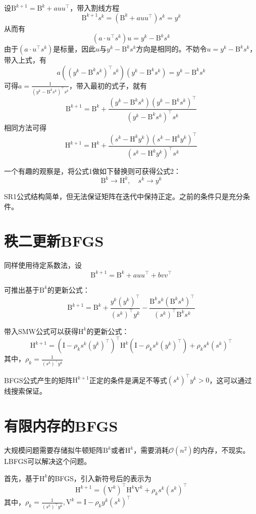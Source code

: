 \documentclass[a4paper]{D:/repositories/MyDGP/latex/PaperReadingLog}
\begin{document}
设$\mathrm{B}^{k+1}=\mathrm{B}^k+auu^\top$，带入割线方程
$$
\mathrm{B}^{k+1}s^k=(\mathrm{B}^k+auu^\top)s^k=y^k
$$
从而有
$$
(a\cdot u^\top s^k)u=y^k-\mathrm{B}^ks^k
$$
由于$(a\cdot u^\top s^k)$是标量，因此$u$与$y^k-\mathrm{B}^ks^k$方向是相同的。不妨令$u=y^k-\mathrm{B}^ks^k$，带入上式，有
$$
a((y^k-\mathrm{B}^ks^k)^\top s^k)(y^k-\mathrm{B}^ks^k)=y^k-\mathrm{B}^ks^k
$$
可得$a=\frac{1}{(y^k-\mathrm{B}^ks^k)^\top s^k}$，带入最初的式子，就有
$$
\mathrm{B}^{k+1}=\mathrm{B}^k+\frac{(y^k-\mathrm{B}^ks^k)(y^k-\mathrm{B}^ks^k)^\top}{(y^k-\mathrm{B}^ks^k)^\top s^k}
$$
相同方法可得
$$
\mathrm{H}^{k+1}=\mathrm{H}^k+\frac{(s^k-\mathrm{H}^ky^k)(s^k-\mathrm{H}^ky^k)^\top}{(s^k-\mathrm{H}^ky^k)^\top s^k}
$$

一个有趣的观察是，将公式1做如下替换则可获得公式2：
$$
\mathrm{B}^k\rightarrow\mathrm{H}^k,\quad s^k\rightarrow y^k
$$

SR1公式结构简单，但无法保证矩阵在迭代中保持正定。之前的条件只是充分条件。

\section{秩二更新BFGS}

同样使用待定系数法，设
$$
\mathrm{B}^{k+1}=\mathrm{B}^k+auu^\top+bvv^\top
$$

可推出基于$\mathrm{B}^k$的更新公式：
$$
\mathrm{B}^{k+1}=\mathrm{B}^k+\frac{y^k(y^k)^\top}{(s^k)^\top y^k}-\frac{\mathrm{B}^ks^k(\mathrm{B}^ks^k)^\top}{(s^k)^\top \mathrm{B}^ks^k}
$$

带入SMW公式可以获得$\mathrm{H}^k$的更新公式：
$$
\mathrm{H}^{k+1}=(\mathrm{I}-\rho_ks^k(y^k)^\top)^\top\mathrm{H}^k(\mathrm{I}-\rho_ks^k(y^k)^\top)+\rho_ks^k(s^k)^\top
$$
其中，$\rho_k=\frac{1}{(s^k)^\top y^k}$

BFGS公式产生的矩阵$\mathrm{H}^{k+1}$正定的条件是满足不等式$(s^k)^\top y^k>0$，这可以通过线搜索保证。

\section{有限内存的BFGS}
大规模问题需要存储拟牛顿矩阵$\mathrm{B}^k$或者$\mathrm{H}^k$，需要消耗$\mathcal{O}(n^2)$的内存，不现实。LBFGS可以解决这个问题。

首先，基于$\mathrm{H}^k$的BFGS，引入新符号后的表示为
$$
\mathrm{H}^{k+1}=(\mathrm{V}^k)^\top \mathrm{H}^k\mathrm{V}^k+\rho_ks^k(s^k)^\top
$$
其中，$\rho_k=\frac{1}{(s^k)^\top y^k}, \mathrm{V}^k=\mathrm{I}-\rho_ky^k(s^k)^\top$
\end{document}
